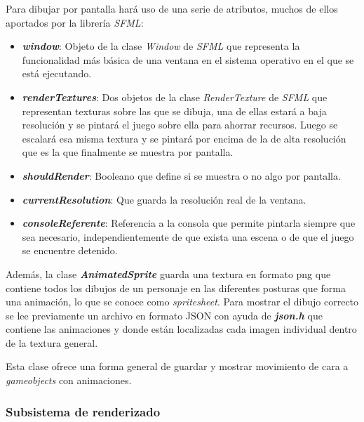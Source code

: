 Para dibujar por pantalla hará uso de una serie de atributos, muchos de ellos aportados por la librería \textit{SFML}:

\begin{itemize}
	\item \textbf{\textit{window}}: Objeto de la clase \textit{Window} de \textit{SFML} que representa la funcionalidad más básica de una ventana en el sistema operativo en el que se está ejecutando.
	\item \textbf{\textit{renderTextures}}: Dos objetos de la clase \textit{RenderTexture} de \textit{SFML} que representan texturas sobre las que se dibuja, una de ellas estará a baja resolución y se pintará el juego sobre ella para ahorrar recursos. Luego se escalará esa misma textura y se pintará por encima de la de alta resolución que es la que finalmente se muestra por pantalla.
	\item \textbf{\textit{shouldRender}}: Booleano que define si se muestra o no algo por pantalla.
	\item \textbf{\textit{currentResolution}}: Que guarda la resolución real de la ventana.
	\item \textbf{\textit{consoleReferente}}: Referencia a la consola que permite pintarla siempre que sea necesario, independientemente de que exista una escena o de que el juego se encuentre detenido.
\end{itemize}

\bigskip

Además, la clase \textbf{\textit{AnimatedSprite}} guarda una textura en formato png que contiene todos los dibujos de un personaje en las diferentes posturas que forma una animación, lo que se conoce como \textit{spritesheet}. Para mostrar el dibujo correcto se lee previamente un archivo en formato JSON con ayuda de \textbf{\textit{json.h}} que contiene las animaciones y donde están localizadas cada imagen individual dentro de la textura general.

\bigskip

Esta clase ofrece una forma general de guardar y mostrar movimiento de cara a \textit{gameobjects} con animaciones.

\subsubsection*{Subsistema de renderizado}

